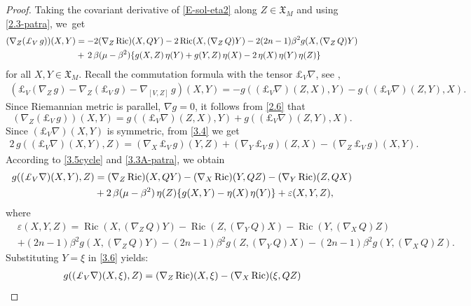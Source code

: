 \documentclass[11pt,a4paper,twoside]{article}
\def\Ric{\operatorname{Ric}}
\begin{document}
{\begin{proof}
Taking the covariant derivative of \eqref{E-sol-eta2} along $Z\in\mathfrak{X}_M$ and using \eqref{2.3-patra}, we~get
\begin{align}\label{3.3A-patra}
\nonumber
 (\nabla_Z(\pounds_{V}\,g))(X,Y) &= -2(\nabla_{Z}\,{\rm Ric})(X,QY)
 -2\Ric(X,(\nabla_Z\,Q)Y)-2(2n-1)\beta^2 g(X,(\nabla_Z\,Q)Y)\\
 & +\,2\,\beta(\mu-\beta^2)\{g(X, Z)\,\eta(Y) + g(Y,Z)\,\eta(X) -2\,\eta(X)\,\eta(Y)\,\eta(Z)\}
\end{align}
for all $X,Y\in\mathfrak{X}_M$.
Recall the commutation formula with the tensor $\pounds_{V}\nabla$, see \cite[p.~23]{yano1970integral},
\begin{align}\label{2.6}
 (\pounds_{V}(\nabla_{Z}\,g) - \nabla_{Z}(\pounds_{V}\,g) - \nabla_{[V,Z]}\,g)(X,Y) = -g((\pounds_{V}\nabla)(Z,X),Y) -g((\pounds_{V}\nabla)(Z,Y),X).
\end{align}
Since Riemannian metric is parallel, $\nabla g=0$, it follows from \eqref{2.6} that
\begin{equation}\label{3.4}
 (\nabla_{Z}(\pounds_{V}\,g))(X,Y) = g((\pounds_{V}\nabla)(Z,X),Y) + g((\pounds_{V}\nabla)(Z,Y),X).
\end{equation}
Since $(\pounds_{V}\nabla)(X,Y)$ is symmetric, from \eqref{3.4} we get
\begin{align}\label{3.5cycle}
 2\,g((\pounds_{V}\nabla)(X,Y), Z) =
 (\nabla_X\,\pounds_{V}\,g)(Y,Z)
 +(\nabla_Y\,\pounds_{V}\,g)(Z,X)
 -(\nabla_Z\,\pounds_{V}\,g)(X,Y) .
\end{align}
According to \eqref{3.5cycle} and \eqref{3.3A-patra}, we obtain
\begin{align}\label{3.6}
\nonumber
 g((\pounds_{V}\nabla)(X,Y),Z) &= (\nabla_{Z}\,{\rm Ric})(X,QY) -(\nabla_{X}\,{\rm Ric})(Y,QZ) -(\nabla_{Y}\,{\rm Ric})(Z,QX)\\
 & +2\,\beta(\mu-\beta^2)\,\eta(Z)\{g(X, Y) -\eta(X)\,\eta(Y) \} +\varepsilon(X,Y,Z),
\end{align}
where
\begin{align*}
 & \varepsilon(X,Y,Z) = \Ric(X,(\nabla_Z\,Q)Y) -\Ric(Z,(\nabla_Y\,Q)X) -\Ric(Y,(\nabla_X\,Q)Z) \\
 & +(2n-1)\beta^2 g(X,(\nabla_Z\,Q)Y) -(2n-1)\beta^2 g(Z,(\nabla_Y\,Q)X) -(2n-1)\beta^2 g(Y,(\nabla_X\,Q)Z).
\end{align*}
Substituting $Y=\xi$ in \eqref{3.6} yields:
\begin{align}\label{E-Lem3-a}
 g((\pounds_{V}\nabla)(X,\xi),Z) =(\nabla_{Z}\,{\rm Ric})(X,\xi)
 -(\nabla_{X}\,{\rm Ric})(\xi,QZ)

\end{align}
\end{proof}}
\end{document}
